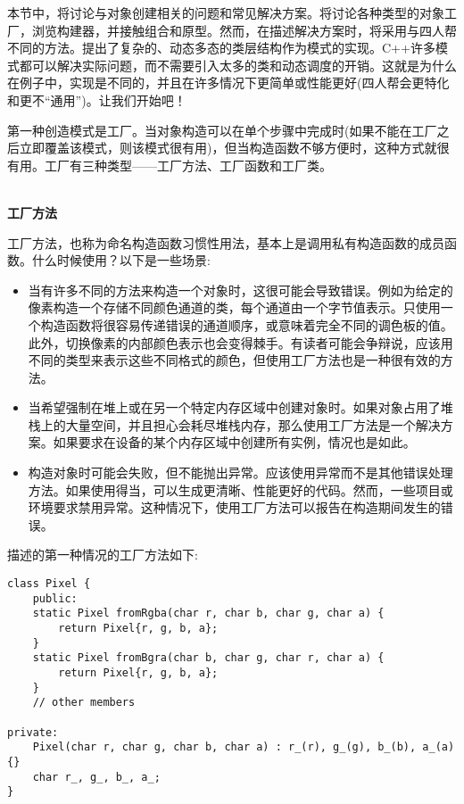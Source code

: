
本节中，将讨论与对象创建相关的问题和常见解决方案。将讨论各种类型的对象工厂，浏览构建器，并接触组合和原型。然而，在描述解决方案时，将采用与四人帮不同的方法。提出了复杂的、动态多态的类层结构作为模式的实现。C++许多模式都可以解决实际问题，而不需要引入太多的类和动态调度的开销。这就是为什么在例子中，实现是不同的，并且在许多情况下更简单或性能更好(四人帮会更特化和更不“通用”)。让我们开始吧！


第一种创造模式是工厂。当对象构造可以在单个步骤中完成时(如果不能在工厂之后立即覆盖该模式，则该模式很有用)，但当构造函数不够方便时，这种方式就很有用。工厂有三种类型——工厂方法、工厂函数和工厂类。

\hspace*{\fill} \\ %
\noindent
\textbf{工厂方法}

工厂方法，也称为命名构造函数习惯性用法，基本上是调用私有构造函数的成员函数。什么时候使用？以下是一些场景:

\begin{itemize}
\item 
当有许多不同的方法来构造一个对象时，这很可能会导致错误。例如为给定的像素构造一个存储不同颜色通道的类，每个通道由一个字节值表示。只使用一个构造函数将很容易传递错误的通道顺序，或意味着完全不同的调色板的值。此外，切换像素的内部颜色表示也会变得棘手。有读者可能会争辩说，应该用不同的类型来表示这些不同格式的颜色，但使用工厂方法也是一种很有效的方法。

\item 
当希望强制在堆上或在另一个特定内存区域中创建对象时。如果对象占用了堆栈上的大量空间，并且担心会耗尽堆栈内存，那么使用工厂方法是一个解决方案。如果要求在设备的某个内存区域中创建所有实例，情况也是如此。

\item 
构造对象时可能会失败，但不能抛出异常。应该使用异常而不是其他错误处理方法。如果使用得当，可以生成更清晰、性能更好的代码。然而，一些项目或环境要求禁用异常。这种情况下，使用工厂方法可以报告在构造期间发生的错误。
\end{itemize}

描述的第一种情况的工厂方法如下:

\begin{lstlisting}[style=styleCXX]
class Pixel {
	public:
	static Pixel fromRgba(char r, char b, char g, char a) {
		return Pixel{r, g, b, a};
	}
	static Pixel fromBgra(char b, char g, char r, char a) {
		return Pixel{r, g, b, a};
    }
	// other members
	
private:
	Pixel(char r, char g, char b, char a) : r_(r), g_(g), b_(b), a_(a) {}
	char r_, g_, b_, a_;
}
\end{lstlisting}


